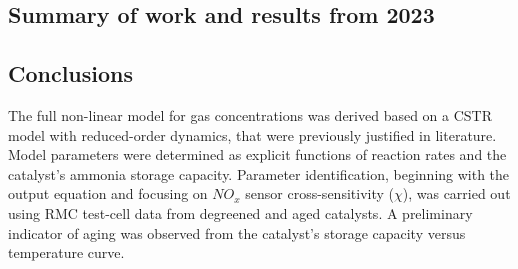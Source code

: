 \subsection{Summary of work and results from 2023}









\subsection{Conclusions}
The full non-linear model for gas concentrations was derived based on a CSTR
model with reduced-order dynamics, that were previously justified in
literature. Model parameters were determined as explicit functions of reaction
rates and the catalyst's ammonia storage capacity.  Parameter identification,
beginning with the output equation and focusing on $NO_x$ sensor
cross-sensitivity ($\chi$), was carried out using RMC test-cell data from
degreened and aged catalysts. A preliminary indicator of aging was observed
from the catalyst's storage capacity versus temperature curve.
